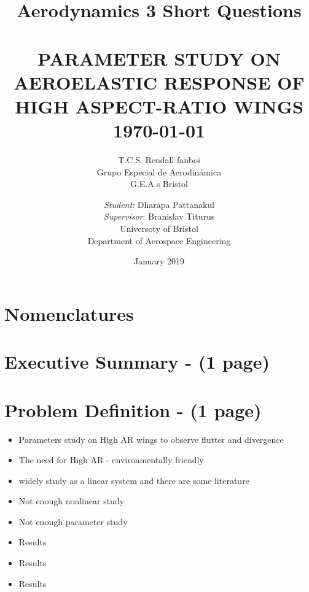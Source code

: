\documentclass[11pt]{article}
\title{Aerodynamics 3 Short Questions}
\date{January 2019}
\author{T.C.S. Rendall fanboi \Group \\ Grupo Especial de Aerodinámica \\ G.E.A.s Bristol}
\begin{document}
{\selectfont
\title{ \normalsize \textsc{}
		\\ [2.0cm]
		\HRule{0.5pt} \\
		\LARGE \textbf{\uppercase{Parameter Study on Aeroelastic Response of  High Aspect-Ratio Wings}
		\HRule{2pt} \\ [0.5cm]
		\normalsize \today \vspace*{5\baselineskip}}
		}
}

\date{}

\author{
        \textit{Student}: Dharapa Pattanakul\\ 
        \textit{Supervisor}: Branislav Titurus\\
		Universoty of Bristol \\
		Department of Aerospace Engineering }

\maketitle
\newpage
\tableofcontents
\newpage
\listoffigures
{}
\cleardoublepage
\listoftables
{}
\cleardoublepage
\newpage
\section*{Nomenclatures}
\cleardoublepage

\newpage
\section{Executive Summary - (1 page)}
\cleardoublepage

\newpage
\section{Problem Definition - (1 page)}
\begin{itemize}
    \item Parameters study on High AR wings to observe flutter and divergence
    \item The need for High AR - environmentally friendly
    \item widely study as a linear system and there are some literature
    \item Not enough nonlinear study
    \item Not enough parameter study
    \item Results
    \item Results
    \item Results
\end{itemize}
\end{document}
